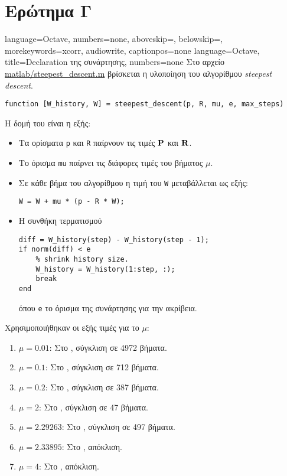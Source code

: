 \section{Ερώτημα Γ}
\newcommand{\plothere}[2]{%
\begin{figure}[htbp]%
\centering%
\texttt{[image: plots/\#1]}%
\caption{#2}
\label{fig:#1}%
\end{figure}%
}
{language=Octave,
numbers=none,
aboveskip=\smallskipamount,
belowskip=\smallskipamount,
morekeywords={xcorr, audiowrite}, %
captionpos=none
}
{language=Octave,
title={Declaration της συνάρτησης},
numbers=none
}
Στο αρχείο \url{matlab/steepest_descent.m} βρίσκεται η υλοποίηση του αλγορίθμου \textit{steepest descent}.
\begin{lstlisting}[style=declaration]
function [W_history, W] = steepest_descent(p, R, mu, e, max_steps)
\end{lstlisting}
Η δομή του είναι η εξής:
\begin{itemize}
\item Τα ορίσματα \lstinline!p! και \lstinline!R! παίρνουν τις τιμές $\mathbf{P}$ και $\mathbf{R}$.
\item Το όρισμα \lstinline!mu! παίρνει τις διάφορες τιμές του βήματος $\mu$.
\item Σε κάθε βήμα του αλγορίθμου η τιμή του \lstinline!W! μεταβάλλεται ως εξής:
\begin{lstlisting}[style=chunk]
W = W + mu * (p - R * W);
\end{lstlisting}
\item Η συνθήκη τερματισμού
\begin{lstlisting}[style=chunk]
diff = W_history(step) - W_history(step - 1);
if norm(diff) < e
    % shrink history size.
    W_history = W_history(1:step, :);
    break
end
\end{lstlisting}
όπου \lstinline!e! το όρισμα της συνάρτησης για την ακρίβεια.
\end{itemize}

Χρησιμοποιήθηκαν οι εξής τιμές για το $\mu$:
\begin{enumerate}
\item $\mu=0.01$: Στο , σύγκλιση σε 4972 βήματα.
\item $\mu=0.1$: Στο , σύγκλιση σε 712 βήματα.
\item $\mu=0.2$: Στο , σύγκλιση σε 387 βήματα.
\item $\mu=2$: Στο , σύγκλιση σε 47 βήματα.
\item $\mu=2.29263$: Στο , σύγκλιση σε 497 βήματα.
\item $\mu=2.33895$: Στο , απόκλιση.
\item $\mu=4$: Στο , απόκλιση.
\end{enumerate}

